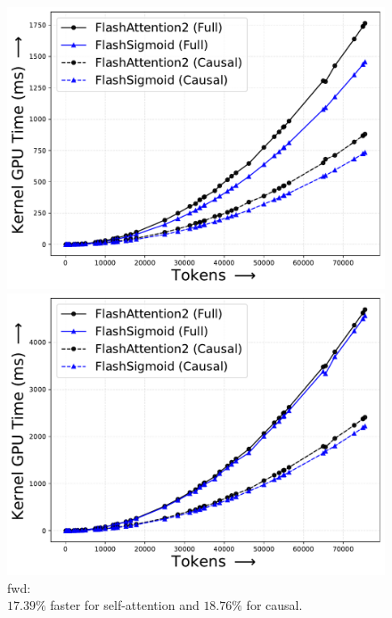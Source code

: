 \begin{figure}[!htbp]
    \centering
    \begin{minipage}{0.24\textwidth}
        \footnotesize
        \centering
        \includegraphics[trim={0 0 0 0}, width=\textwidth]{figures/_flash_figures/final_arxiv/f2/individual/h100/H100_noalibi_flash_fwd_kernel_Full_17.39_0.07_Causal_18.76_0.06.pdf}
        \captionsetup{justification=centering}
        \caption*{
            fwd:\\$17.39\%$ faster for self-attention and $18.76\%$ for causal.
        } 
    \end{minipage}
    \hfill
    \begin{minipage}{0.24\textwidth}
        \centering        
        \includegraphics[trim={0 0 0 0}, width=\textwidth]{figures/_flash_figures/final_arxiv/f2/individual/h100/H100_noalibi_flash_bwd_dq_dk_dv_loop_seqk_parallel_kernel_Full_3.29_0.06_Causal_6.97_0.07.pdf}

\end{minipage}
\end{figure}

